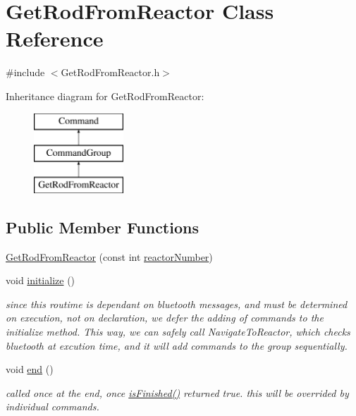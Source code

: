 \hypertarget{classGetRodFromReactor}{\section{Get\-Rod\-From\-Reactor Class Reference}
\label{classGetRodFromReactor}
}


{\ttfamily \#include $<$Get\-Rod\-From\-Reactor.\-h$>$}

Inheritance diagram for Get\-Rod\-From\-Reactor\-:\begin{figure}[H]
\begin{center}
\leavevmode
\includegraphics[height=3.000000cm]{classGetRodFromReactor}
\end{center}
\end{figure}
\subsection*{Public Member Functions}
\begin{DoxyCompactItemize}
\item 
\hyperlink{classGetRodFromReactor_ae6432d3e1fd6ca0e882d9cbff1b14737}{Get\-Rod\-From\-Reactor} (const int \hyperlink{classGetRodFromReactor_ad2c4d389db38e728e540206aed467670}{reactor\-Number})
\item 
void \hyperlink{classGetRodFromReactor_afb5a43f9368820438622cc6e08a9df10}{initialize} ()
\begin{DoxyCompactList}\small\item\em since this routime is dependant on bluetooth messages, and must be determined on execution, not on declaration, we defer the adding of commands to the initialize method. This way, we can safely call Navigate\-To\-Reactor, which checks bluetooth at excution time, and it will add commands to the group sequentially. \end{DoxyCompactList}\item 
void \hyperlink{classGetRodFromReactor_a8d375cbbf822ea0f22058a264347bd37}{end} ()
\begin{DoxyCompactList}\small\item\em called once at the end, once \hyperlink{classCommandGroup_a96807a2763adf9e21ebf2cb9e3574e3c}{is\-Finished()} returned true. this will be overrided by individual commands. \end{DoxyCompactList}\end{DoxyCompactItemize}
